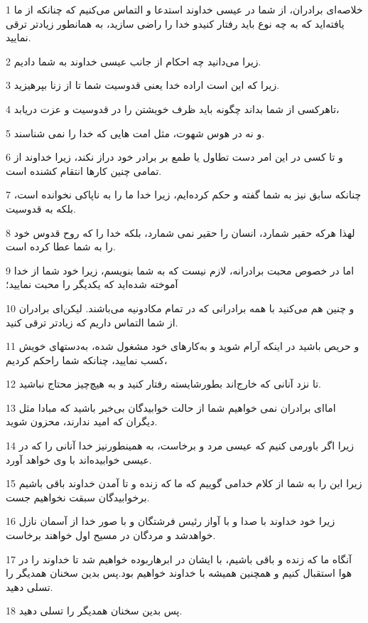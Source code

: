 \par 1 خلاصه‌ای برادران، از شما در عیسی خداوند استدعا و التماس می‌کنیم که چنانکه از ما یافته‌اید که به چه نوع باید رفتار کنیدو خدا را راضی سازید، به همانطور زیادتر ترقی نمایید.
\par 2 زیرا می‌دانید چه احکام از جانب عیسی خداوند به شما دادیم.
\par 3 زیرا که این است اراده خدا یعنی قدوسیت شما تا از زنا بپرهیزید.
\par 4 تاهرکسی از شما بداند چگونه باید ظرف خویشتن را در قدوسیت و عزت دریابد،
\par 5 و نه در هوس شهوت، مثل امت هایی که خدا را نمی شناسند.
\par 6 و تا کسی در این امر دست تطاول یا طمع بر برادر خود دراز نکند، زیرا خداوند از تمامی چنین کارها انتقام کشنده است.
\par 7 چنانکه سابق نیز به شما گفته و حکم کرده‌ایم، زیرا خدا ما را به ناپاکی نخوانده است، بلکه به قدوسیت.
\par 8 لهذا هرکه حقیر شمارد، انسان را حقیر نمی شمارد، بلکه خدا را که روح قدوس خود را به شما عطا کرده است.
\par 9 اما در خصوص محبت برادرانه، لازم نیست که به شما بنویسم، زیرا خود شما از خدا آموخته شده‌اید که یکدیگر را محبت نمایید؛
\par 10 و چنین هم می‌کنید با همه برادرانی که در تمام مکادونیه می‌باشند. لیکن‌ای برادران از شما التماس داریم که زیادتر ترقی کنید.
\par 11 و حریص باشید در اینکه آرام شوید و به‌کارهای خود مشغول شده، به‌دستهای خویش کسب نمایید، چنانکه شما راحکم کردیم،
\par 12 تا نزد آنانی که خارج‌اند بطورشایسته رفتار کنید و به هیچ‌چیز محتاج نباشید.
\par 13 اما‌ای برادران نمی خواهیم شما از حالت خوابیدگان بی‌خبر باشید که مبادا مثل دیگران که امید ندارند، محزون شوید.
\par 14 زیرا اگر باورمی کنیم که عیسی مرد و برخاست، به همینطورنیز خدا آنانی را که در عیسی خوابیده‌اند با وی خواهد آورد.
\par 15 زیرا این را به شما از کلام خدامی گوییم که ما که زنده و تا آمدن خداوند باقی باشیم برخوابیدگان سبقت نخواهیم جست.
\par 16 زیرا خود خداوند با صدا و با آواز رئیس فرشتگان و با صور خدا از آسمان نازل خواهدشد و مردگان در مسیح اول خواهند برخاست.
\par 17 آنگاه ما که زنده و باقی باشیم، با ایشان در ابرهاربوده خواهیم شد تا خداوند را در هوا استقبال کنیم و همچنین همیشه با خداوند خواهیم بود.پس بدین سخنان همدیگر را تسلی دهید.
\par 18 پس بدین سخنان همدیگر را تسلی دهید.

